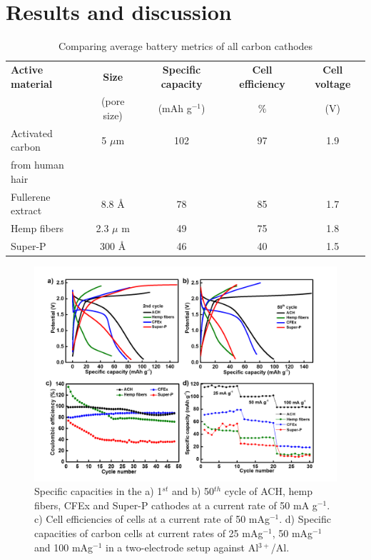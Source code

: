 \section{Results and discussion}
\begin{table}[t]
\caption{Comparing average battery metrics of all carbon cathodes} \label{table1}
\begin{center}
\begin{tabular}{|lcccc|}
\hline
\textbf{Active material} & {\textbf{Size}} & \textbf{Specific capacity} & \textbf{Cell efficiency} & {\textbf{Cell voltage}}\\
 & (pore size) & (mAh g$^{-1}$) & $\%$ & (V)\\
\hline
Activated carbon & 5 ${\mu}$m & 102 & 97 & 1.9 \\
from human hair & & & & \\
Fullerene extract & 8.8 \AA & 78 & 85 & 1.7 \\
Hemp fibers & 2.3 $\mu$ m & 49 & 75 & 1.8 \\
Super-P & 300 \AA & 46 & 40 & 1.5 \\
\hline  %
\end{tabular}
\end{center}
\end{table}
\begin{figure}[tbh!]
  \centering
  \includegraphics[width=\textwidth]{Figures/chap5fig/cdcall}
    \caption{Specific capacities in the a) 1$^{st}$ and b) 50$^{th}$ cycle of ACH, hemp fibers, CFEx and Super-P cathodes at a current rate of 50 mA g$^{-1}$. c) Cell efficiencies of cells at a current rate of 50 mAg$^{-1}$. d) Specific capacities of carbon cells at current rates of 25 mAg$^{-1}$, 50 mAg$^{-1}$ and 100 mAg$^{-1}$ in a two-electrode setup against Al$^{3+}$/Al. }
  \label{Figures/chap5fig:cdcall}
\end{figure}
